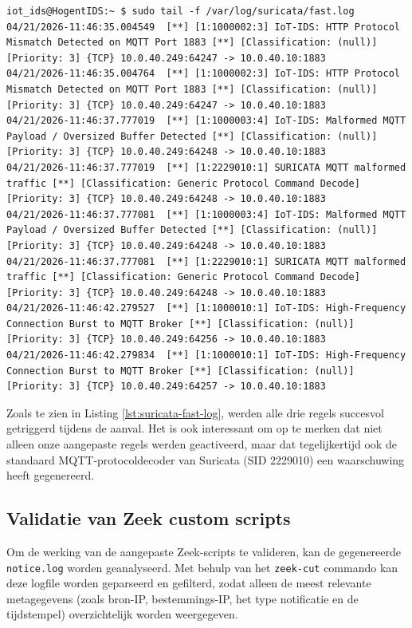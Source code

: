 \begin{listing}[H]
\begin{verbatim}
iot_ids@HogentIDS:~ $ sudo tail -f /var/log/suricata/fast.log 
04/21/2026-11:46:35.004549  [**] [1:1000002:3] IoT-IDS: HTTP Protocol Mismatch Detected on MQTT Port 1883 [**] [Classification: (null)] [Priority: 3] {TCP} 10.0.40.249:64247 -> 10.0.40.10:1883
04/21/2026-11:46:35.004764  [**] [1:1000002:3] IoT-IDS: HTTP Protocol Mismatch Detected on MQTT Port 1883 [**] [Classification: (null)] [Priority: 3] {TCP} 10.0.40.249:64247 -> 10.0.40.10:1883
04/21/2026-11:46:37.777019  [**] [1:1000003:4] IoT-IDS: Malformed MQTT Payload / Oversized Buffer Detected [**] [Classification: (null)] [Priority: 3] {TCP} 10.0.40.249:64248 -> 10.0.40.10:1883
04/21/2026-11:46:37.777019  [**] [1:2229010:1] SURICATA MQTT malformed traffic [**] [Classification: Generic Protocol Command Decode] [Priority: 3] {TCP} 10.0.40.249:64248 -> 10.0.40.10:1883
04/21/2026-11:46:37.777081  [**] [1:1000003:4] IoT-IDS: Malformed MQTT Payload / Oversized Buffer Detected [**] [Classification: (null)] [Priority: 3] {TCP} 10.0.40.249:64248 -> 10.0.40.10:1883
04/21/2026-11:46:37.777081  [**] [1:2229010:1] SURICATA MQTT malformed traffic [**] [Classification: Generic Protocol Command Decode] [Priority: 3] {TCP} 10.0.40.249:64248 -> 10.0.40.10:1883
04/21/2026-11:46:42.279527  [**] [1:1000010:1] IoT-IDS: High-Frequency Connection Burst to MQTT Broker [**] [Classification: (null)] [Priority: 3] {TCP} 10.0.40.249:64256 -> 10.0.40.10:1883
04/21/2026-11:46:42.279834  [**] [1:1000010:1] IoT-IDS: High-Frequency Connection Burst to MQTT Broker [**] [Classification: (null)] [Priority: 3] {TCP} 10.0.40.249:64257 -> 10.0.40.10:1883
\end{verbatim}
\caption{Uitvoer van \texttt{fast.log} tijdens de actieve validatie van de drie custom Suricata-regels.}
\label{lst:suricata-fast-log}

\end{listing}

Zoals te zien in Listing \ref{lst:suricata-fast-log}, werden alle drie regels succesvol getriggerd tijdens de aanval. Het is ook interessant om op te merken dat niet alleen onze aangepaste regels werden geactiveerd, maar dat tegelijkertijd ook de standaard MQTT-protocoldecoder van Suricata (SID 2229010) een waarschuwing heeft gegenereerd.



\subsection{Validatie van Zeek custom scripts}
Om de werking van de aangepaste Zeek-scripts te valideren, kan de gegenereerde \texttt{notice.log} worden geanalyseerd. Met behulp van het \texttt{zeek-cut} commando kan deze logfile worden geparseerd en gefilterd, zodat alleen de meest relevante metagegevens (zoals bron-IP, bestemmings-IP, het type notificatie en de tijdstempel) overzichtelijk worden weergegeven.

